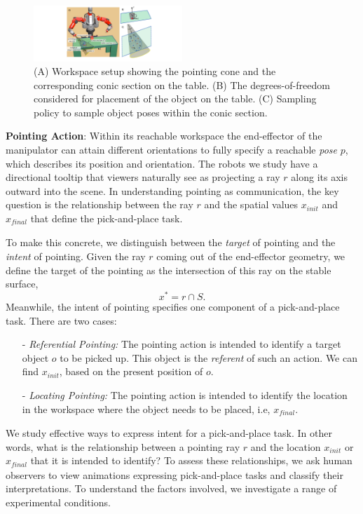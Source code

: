 \documentclass[letterpaper]{article} %
\newcommand{\xinit}{\ensuremath{x_{\textit{init}}}}
\newcommand{\xfinal}{\ensuremath{x_{\textit{final}}}}
\begin{document}
\begin{figure}[t]
\centering
\includegraphics[width=0.5\textwidth]{pointing_diagram.pdf}
\caption{(A) Workspace setup showing the pointing cone and the corresponding conic section on the table. (B) The degrees-of-freedom considered for placement of the object on the table. (C) Sampling policy to sample object poses within the conic section.}
    \label{fig:pointing}
\end{figure}

\noindent\textbf{Pointing Action}: Within its reachable workspace the end-effector of the manipulator can attain different orientations to fully specify a reachable \textit{pose} $p$, which describes its position and orientation.  The robots we study have a directional tooltip that viewers naturally see as projecting a ray $r$ along its axis outward into the scene.  In understanding pointing as communication, the key question is the relationship between the ray $r$ and the spatial values $\xinit$ and $\xfinal$ that define the pick-and-place task.


To make this concrete, we distinguish between the \emph{target} of pointing and the \emph{intent} of pointing. Given the ray $r$ coming out of the end-effector geometry, we define the target of the pointing as the intersection of this ray on the stable surface, $$x^*= r\cap S.$$ Meanwhile, the intent of pointing specifies one component of a pick-and-place task.  There are two cases:
\begin{itemize}
    \item [-] \textit{Referential Pointing:} The pointing action is intended to identify a target object $o$ to be picked up. This object is the \textit{referent} of such an action. We can find $\xinit$, based on the present position of $o$.
    \item [-] \textit{Locating Pointing:} The pointing action is intended to identify the location in the workspace where the object needs to be placed, i.e, $\xfinal$.
\end{itemize}


We study effective ways to express intent for a pick-and-place task. In other words, what is the relationship between a pointing ray $r$ and the location $\xinit$ or $\xfinal$ that it is intended to identify?  To assess these relationships, we ask human observers to view animations expressing pick-and-place tasks and classify their interpretations.  To understand the factors involved, we investigate a range of experimental conditions.
\end{document}
